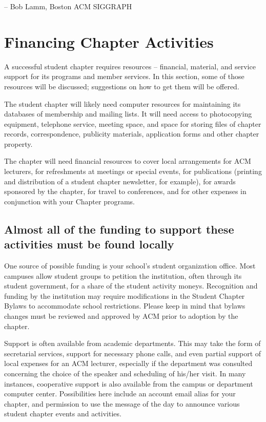 -- Bob Lamm, Boston ACM SIGGRAPH

\section{Financing Chapter Activities}
\label{sec:sec07}
A successful student chapter requires resources -- financial, material, and
service support for its programs and member services. In this section, some of
those resources will be discussed; suggestions on how to get them will be
offered.

The student chapter will likely need computer resources for maintaining its
databases of membership and mailing lists. It will need access to photocopying
equipment, telephone service, meeting space, and space for storing files of
chapter records, correspondence, publicity materials, application forms and
other chapter property.

The chapter will need financial resources to cover local arrangements for ACM
lecturers, for refreshments at meetings or special events, for publications
(printing and distribution of a student chapter newsletter, for example), for
awards sponsored by the chapter, for travel to conferences, and for other
expenses in conjunction with your Chapter programs.

\subsection{Almost all of the funding to support these activities must be found
						locally}
One source of possible funding is your school's student organization office.
Most campuses allow student groups to petition the institution, often through
its student government, for a share of the student activity moneys. Recognition
and funding by the institution may require modifications in the Student Chapter
Bylaws to accommodate school restrictions. Please keep in mind that bylaws
changes must be reviewed and approved by ACM prior to adoption by the chapter.

Support is often available from academic departments. This may take the form of
secretarial services, support for necessary phone calls, and even partial
support of local expenses for an ACM lecturer, especially if the department was
consulted concerning the choice of the speaker and scheduling of his/her visit.
In many instances, cooperative support is also available from the campus or
department computer center. Possibilities here include an account email alias
for your chapter, and permission to use the message of the day to announce
various student chapter events and activities.

